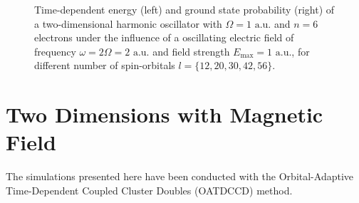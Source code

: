 \begin{figure}[!h]
{\begin{minipage}{0.6\textwidth}
    \end{minipage}
    }
    \caption{Time-dependent energy (left) and ground state probability (right)
        of a two-dimensional harmonic oscillator with $\Omega=1 \text{ a.u.}$
        and $n=6$ electrons under the influence of a oscillating electric field 
        of frequency $\omega = 2 \Omega = 2 \text{ a.u.}$ and field strength
        $E_\text{max}=1 \text{ a.u.}$,
        for different number of spin-orbitals $l=\{12,20,30,42,56\}$.
    }
    \label{fig:2d_n6_qd}
\end{figure}

\vfill
\pagebreak

\section{Two Dimensions with Magnetic Field}
\label{app:b_field}

The simulations presented here have been conducted with the Orbital-Adaptive 
Time-Dependent Coupled Cluster Doubles (OATDCCD) method. 

